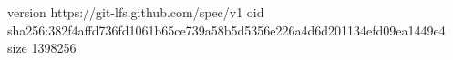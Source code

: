 version https://git-lfs.github.com/spec/v1
oid sha256:382f4affd736fd1061b65ce739a58b5d5356e226a4d6d201134efd09ea1449e4
size 1398256
